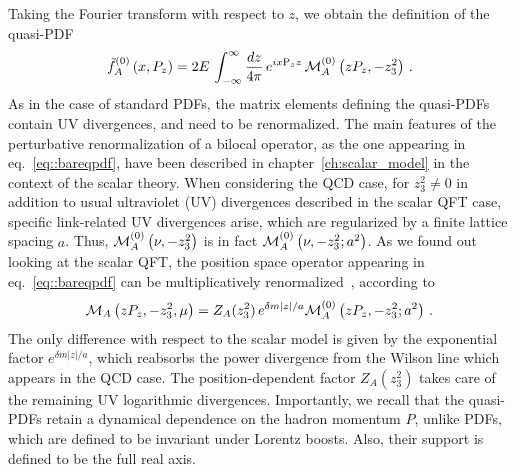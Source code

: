 %
Taking
the Fourier transform with respect to $z$, we obtain the definition of the
quasi-PDF  
\begin{align}
	\label{eq::bareqpdf}                                                 
	\tilde{f}_A^{(0)}\left( x, P_z\right) = 
	2 E \, \int_{-\infty}^{\infty}\frac{dz}{4\pi}\,e^{i x \text{P}_z z}\,\mathcal{M}_A^{(0)}\left( zP_z,-z_3^2 \right)\,. 
\end{align}
As in the case of standard PDFs,
the matrix elements defining the quasi-PDFs contain UV divergences, and need to be renormalized. The
main features of the perturbative renormalization of a bilocal operator, 
as the one appearing in eq.~\eqref{eq::bareqpdf}, have been described in chapter~\ref{ch:scalar_model}
in the context of the scalar theory.
When considering the QCD case, for $z_3^2  \neq 0$ 
in addition to usual ultraviolet (UV) divergences described in the scalar QFT case, 
specific link-related UV divergences arise, which are regularized by a finite lattice spacing $a$. 
Thus, $\mathcal{M}_A^{(0)}\left( \nu,-z_3^2 \right)$ is in fact $\mathcal{M}_A^{(0)}\left( \nu,-z_3^2; a^2 \right)$.
As we found out looking at the scalar QFT,
the position space operator appearing in eq.~\eqref{eq::bareqpdf} can be multiplicatively
renormalized~\cite{Ishikawa:2017faj}, according to
\begin{align}
    \mathcal{M}_A\left( z P_z,-z_3^2, \mu \right) = Z_{A}(z_3^2)\,
    e^{\delta m |z|/a} \mathcal{M}_A^{(0)}\left( z P_z,-z_3^2; a^2 \right)\,.
\end{align}
The only difference with respect to the scalar model is given by
the exponential factor $e^{\delta m |z|/a}$, which reabsorbs the power divergence
from the Wilson line which appears in the QCD case. The position-dependent factor $Z_{A}(z_3^2)$ takes care of
the remaining UV logarithmic divergences.  
%
Importantly, we recall that the quasi-PDFs retain a dynamical dependence on the hadron momentum
$P$, unlike PDFs, which are defined to be invariant under Lorentz boosts. Also,
their support is defined to be the full real axis.

